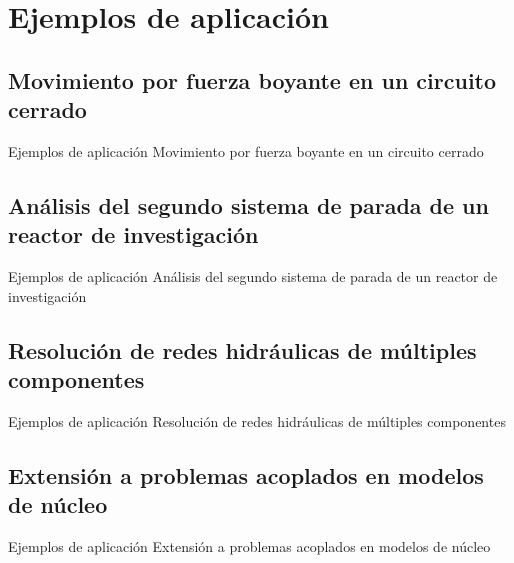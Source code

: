 \section{Ejemplos de aplicación}

\subsection{Movimiento por fuerza boyante en un circuito cerrado}

\begin{frame}
{Ejemplos de aplicación}
{Movimiento por fuerza boyante en un circuito cerrado}

\end{frame}


\subsection{Análisis del segundo sistema de parada de un reactor de investigación}

\begin{frame}
{Ejemplos de aplicación}
{Análisis del segundo sistema de parada de un reactor de investigación}

\end{frame}


\subsection{Resolución de redes hidráulicas de múltiples componentes}

\begin{frame}
{Ejemplos de aplicación}
{Resolución de redes hidráulicas de múltiples componentes}

\end{frame}

\subsection{Extensión a problemas acoplados en modelos de núcleo}

\begin{frame}
{Ejemplos de aplicación}
{Extensión a problemas acoplados en modelos de núcleo}

\end{frame}